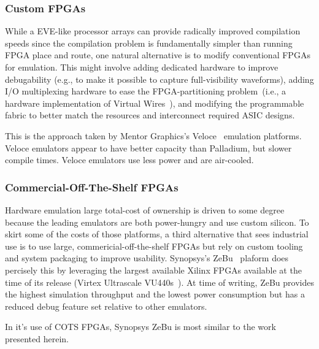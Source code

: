 \subsubsection{Custom FPGAs}
While a EVE-like processor arrays can provide radically improved compilation speeds since
the compilation problem is fundamentally simpler than running FPGA place and
route, one natural alternative is to modify conventional FPGAs for emulation.
This might involve adding dedicated hardware to improve debugability (e.g., to make it
possible to capture full-visibility waveforms), adding I/O multiplexing
hardware to ease the FPGA-partitioning problem~(i.e., a hardware implementation of Virtual Wires~\cite{VirtualWires}), and modifying the programmable
fabric to better match the resources and interconnect required ASIC designs.

This is the approach taken by Mentor Graphics's Veloce~\cite{Veloce} emulation platforms.
Veloce emulators appear to have better capacity than Palladium, but slower
compile times. Veloce emulators use less power and are air-cooled.

\subsubsection{Commercial-Off-The-Shelf FPGAs}

Hardware emulation large total-cost of ownership is driven to some degree
because the leading emulators are both power-hungry and use custom silicon. To
skirt some of the costs of those platforms, a third alternative that sees
industrial use is to use large, commericial-off-the-shelf FPGAs but rely on
custom tooling and system packaging to improve usability. Synopsys's
ZeBu~\cite{ZeBu} plaform does percisely this by leveraging the largest
available Xilinx FPGAs available at the time of its release (Virtex Ultrascale
VU440s~\cite{ZeBu}). At time of writing, ZeBu provides the highest simulation
throughput and the lowest power consumption but has a reduced debug feature set
relative to other emulators.

In it's use of COTS FPGAs, Synopsys ZeBu is most similar to the work presented herein. 

